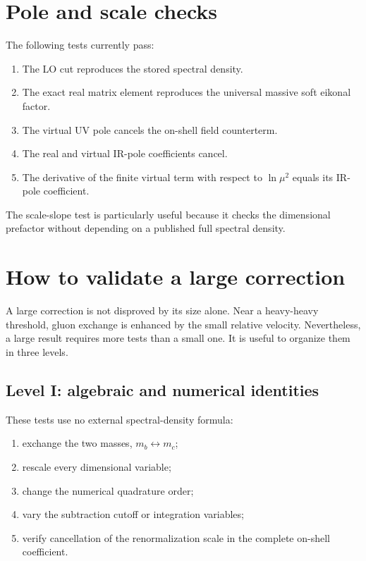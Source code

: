\documentclass[11pt]{article}
\begin{document}
\section{Pole and scale checks}

The following tests currently pass:
\begin{enumerate}
 \item The LO cut reproduces the stored spectral density.
 \item The exact real matrix element reproduces the universal massive soft
 eikonal factor.
 \item The virtual UV pole cancels the on-shell field counterterm.
 \item The real and virtual IR-pole coefficients cancel.
 \item The derivative of the finite virtual term with respect to
 \(\ln\mu^2\) equals its IR-pole coefficient.
\end{enumerate}

The scale-slope test is particularly useful because it checks the dimensional
prefactor without depending on a published full spectral density.

\section{How to validate a large correction}

A large correction is not disproved by its size alone.  Near a heavy-heavy
threshold, gluon exchange is enhanced by the small relative velocity.
Nevertheless, a large result requires more tests than a small one.  It is
useful to organize them in three levels.

\subsection{Level I: algebraic and numerical identities}

These tests use no external spectral-density formula:
\begin{enumerate}
 \item exchange the two masses, \(m_b\leftrightarrow m_c\);
 \item rescale every dimensional variable;
 \item change the numerical quadrature order;
 \item vary the subtraction cutoff or integration variables;
 \item verify cancellation of the renormalization scale in the complete
 on-shell coefficient.
\end{enumerate}
\end{document}
